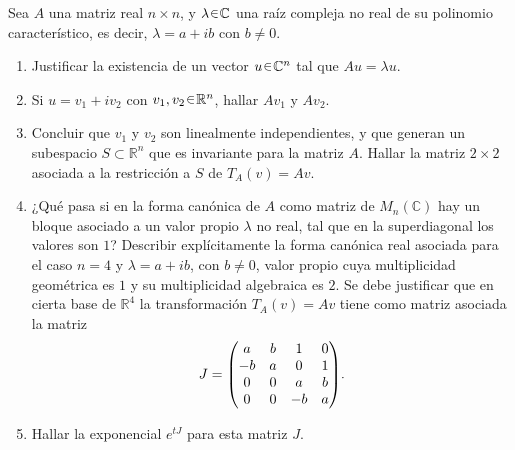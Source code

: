 \begin{ejer}
Sea $A$ una matriz real $n \times n$, y $\lambda \en \mathbb{C}$ una raíz compleja no real de su polinomio característico, es decir, $\lambda = a + ib$ con $b \neq 0$.
\begin{enumerate}[label = (\alph*)]
\item Justificar la existencia de un vector $u \en \mathbb{C}^n$ tal que $Au = \lambda u$.

\item Si $u = v_1 + i v_2$ con $v_1, v_2 \en \mathbb{R}^n$, hallar $Av_1$ y $Av_2$.

\item Concluir que $v_1$ y $v_2$ son linealmente independientes, y que generan un subespacio $S \subset \mathbb{R}^n$ que es invariante para la matriz $A$. Hallar la matriz $2 \times 2$ asociada a la restricción a $S$ de $T_A(v) = Av$.

\item ¿Qué pasa si en la forma canónica de $A$ como matriz de $M_n(\mathbb{C})$
hay un bloque asociado a un valor propio $\lambda$ no real, tal que en la superdiagonal los valores son $1$? Describir explícitamente la forma canónica real asociada para el caso $n = 4$ y $\lambda = a + ib$, con $b \neq 0$, valor propio cuya multiplicidad geométrica es $1$ y su multiplicidad algebraica es $2$. Se debe justificar que en cierta base de $\mathbb{R}^4$ la transformación $T_A(v) = Av$ tiene como matriz asociada la matriz
\[
J =
\mqty(
a & b & 1 & 0 \\
-b & a & 0 & 1 \\
0 & 0 & a & b \\
0 & 0 & -b & a
).
\]

\item Hallar la exponencial $e^{tJ}$ para esta matriz $J$.
\end{enumerate}
\end{ejer}
